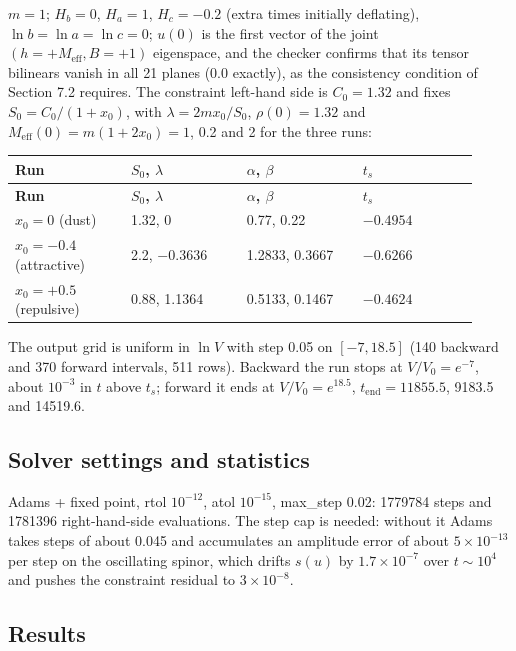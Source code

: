 \documentclass[11pt]{article}
\begin{document}
$m=1$; $H_b=0$, $H_a=1$, $H_c=-0.2$ (extra times initially deflating), $\ln b=\ln a=\ln c=0$; $u(0)$ is the first vector of the joint $(h=+M_{\mathrm{eff}},B=+1)$ eigenspace, and the checker confirms that its tensor bilinears vanish in all 21 planes (0.0 exactly), as the consistency condition of Section 7.2 requires. The constraint left-hand side is $C_0=1.32$ and fixes $S_0=C_0/(1+x_0)$, with $\lambda=2mx_0/S_0$, $\rho(0)=1.32$ and $M_{\mathrm{eff}}(0)=m(1+2x_0)=1$, 0.2 and 2 for the three runs:

\begin{longtable}{@{}p{0.230\linewidth}p{0.230\linewidth}p{0.230\linewidth}p{0.230\linewidth}@{}}
\toprule
\textbf{Run} & \textbf{$S_0$, $\lambda$} & \textbf{$\alpha$, $\beta$} & \textbf{$t_s$} \\
\midrule
\endfirsthead
\toprule
\textbf{Run} & \textbf{$S_0$, $\lambda$} & \textbf{$\alpha$, $\beta$} & \textbf{$t_s$} \\
\midrule
\endhead
$x_0=0$ (dust) & 1.32, 0 & 0.77, 0.22 & $-0.4954$ \\
$x_0=-0.4$ (attractive) & 2.2, $-0.3636$ & 1.2833, 0.3667 & $-0.6266$ \\
$x_0=+0.5$ (repulsive) & 0.88, 1.1364 & 0.5133, 0.1467 & $-0.4624$ \\
\bottomrule
\end{longtable}

The output grid is uniform in $\ln V$ with step 0.05 on $[-7,18.5]$ (140 backward and 370 forward intervals, 511 rows). Backward the run stops at $V/V_0=e^{-7}$, about $10^{-3}$ in $t$ above $t_s$; forward it ends at $V/V_0=e^{18.5}$, $t_{\mathrm{end}}=11855.5$, 9183.5 and 14519.6.

\subsection{Solver settings and statistics}

Adams + fixed point, rtol $10^{-12}$, atol $10^{-15}$, max\_step 0.02: 1779784 steps and 1781396 right-hand-side evaluations. The step cap is needed: without it Adams takes steps of about 0.045 and accumulates an amplitude error of about $5\times10^{-13}$ per step on the oscillating spinor, which drifts $s(u)$ by $1.7\times10^{-7}$ over $t\sim10^4$ and pushes the constraint residual to $3\times10^{-8}$.

\subsection{Results}
\end{document}
